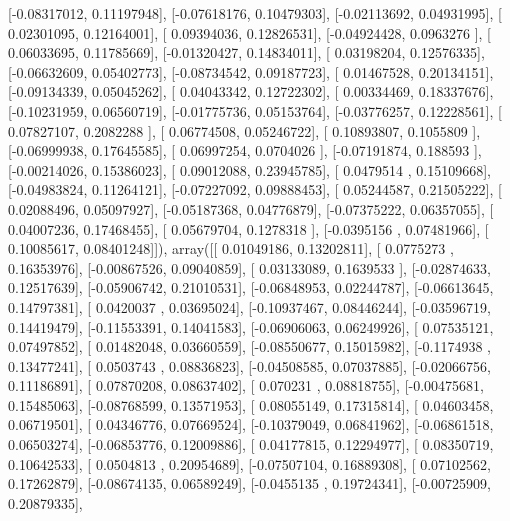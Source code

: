 \documentclass{article}
\begin{document}
       [-0.08317012,  0.11197948],
       [-0.07618176,  0.10479303],
       [-0.02113692,  0.04931995],
       [ 0.02301095,  0.12164001],
       [ 0.09394036,  0.12826531],
       [-0.04924428,  0.0963276 ],
       [ 0.06033695,  0.11785669],
       [-0.01320427,  0.14834011],
       [ 0.03198204,  0.12576335],
       [-0.06632609,  0.05402773],
       [-0.08734542,  0.09187723],
       [ 0.01467528,  0.20134151],
       [-0.09134339,  0.05045262],
       [ 0.04043342,  0.12722302],
       [ 0.00334469,  0.18337676],
       [-0.10231959,  0.06560719],
       [-0.01775736,  0.05153764],
       [-0.03776257,  0.12228561],
       [ 0.07827107,  0.2082288 ],
       [ 0.06774508,  0.05246722],
       [ 0.10893807,  0.1055809 ],
       [-0.06999938,  0.17645585],
       [ 0.06997254,  0.0704026 ],
       [-0.07191874,  0.188593  ],
       [-0.00214026,  0.15386023],
       [ 0.09012088,  0.23945785],
       [ 0.0479514 ,  0.15109668],
       [-0.04983824,  0.11264121],
       [-0.07227092,  0.09888453],
       [ 0.05244587,  0.21505222],
       [ 0.02088496,  0.05097927],
       [-0.05187368,  0.04776879],
       [-0.07375222,  0.06357055],
       [ 0.04007236,  0.17468455],
       [ 0.05679704,  0.1278318 ],
       [-0.0395156 ,  0.07481966],
       [ 0.10085617,  0.08401248]]), array([[ 0.01049186,  0.13202811],
       [ 0.0775273 ,  0.16353976],
       [-0.00867526,  0.09040859],
       [ 0.03133089,  0.1639533 ],
       [-0.02874633,  0.12517639],
       [-0.05906742,  0.21010531],
       [-0.06848953,  0.02244787],
       [-0.06613645,  0.14797381],
       [ 0.0420037 ,  0.03695024],
       [-0.10937467,  0.08446244],
       [-0.03596719,  0.14419479],
       [-0.11553391,  0.14041583],
       [-0.06906063,  0.06249926],
       [ 0.07535121,  0.07497852],
       [ 0.01482048,  0.03660559],
       [-0.08550677,  0.15015982],
       [-0.1174938 ,  0.13477241],
       [ 0.0503743 ,  0.08836823],
       [-0.04508585,  0.07037885],
       [-0.02066756,  0.11186891],
       [ 0.07870208,  0.08637402],
       [ 0.070231  ,  0.08818755],
       [-0.00475681,  0.15485063],
       [-0.08768599,  0.13571953],
       [ 0.08055149,  0.17315814],
       [ 0.04603458,  0.06719501],
       [ 0.04346776,  0.07669524],
       [-0.10379049,  0.06841962],
       [-0.06861518,  0.06503274],
       [-0.06853776,  0.12009886],
       [ 0.04177815,  0.12294977],
       [ 0.08350719,  0.10642533],
       [ 0.0504813 ,  0.20954689],
       [-0.07507104,  0.16889308],
       [ 0.07102562,  0.17262879],
       [-0.08674135,  0.06589249],
       [-0.0455135 ,  0.19724341],
       [-0.00725909,  0.20879335],
\end{document}
